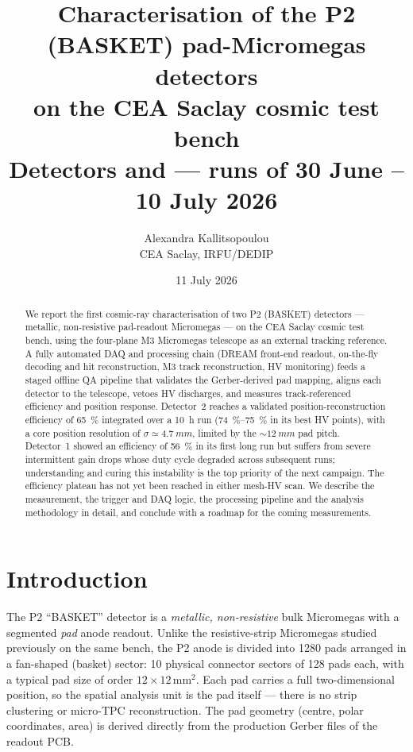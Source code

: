 \documentclass[11pt,a4paper]{article}
\title{\textbf{Characterisation of the P2 (BASKET) pad-Micromegas detectors\\
       on the CEA Saclay cosmic test bench}\\[1ex]
       \large Detectors \detone{} and \dettwo{} --- runs of 30 June -- 10 July 2026}
\author{Alexandra Kallitsopoulou\\ \small CEA Saclay, IRFU/DEDIP}
\date{11 July 2026}
\begin{document}
\maketitle

\begin{abstract}
\noindent
We report the first cosmic-ray characterisation of two P2 (BASKET) detectors ---
metallic, non-resistive pad-readout Micromegas --- on the CEA Saclay cosmic test
bench, using the four-plane M3 Micromegas telescope as an external tracking
reference. A fully automated DAQ and processing chain (DREAM front-end readout,
on-the-fly decoding and hit reconstruction, M3 track reconstruction, HV
monitoring) feeds a staged offline QA pipeline that validates the
Gerber-derived pad mapping, aligns each detector to the telescope, vetoes
HV discharges, and measures track-referenced efficiency and position response.
Detector~2 reaches a validated position-reconstruction efficiency of
\SI{65}{\percent} integrated over a \SI{10}{h} run (\SIrange{74}{75}{\percent}
in its best HV points), with a core position resolution of
$\sigma \simeq \SI{4.7}{mm}$, limited by the \(\sim\SI{12}{mm}\) pad pitch.
Detector~1 showed an efficiency of \SI{56}{\percent} in its first long run but
suffers from severe intermittent gain drops whose duty cycle degraded across
subsequent runs; understanding and curing this instability is the top priority
of the next campaign. The efficiency plateau has not yet been reached in either
mesh-HV scan. We describe the measurement, the trigger and DAQ logic, the
processing pipeline and the analysis methodology in detail, and conclude with a
roadmap for the coming measurements.
\end{abstract}

\tableofcontents
\clearpage

\section{Introduction}

The P2 ``BASKET'' detector is a \emph{metallic, non-resistive} bulk Micromegas
with a segmented \emph{pad} anode readout. Unlike the resistive-strip
Micromegas studied previously on the same bench, the P2 anode is divided into
1280 pads arranged in a fan-shaped (basket) sector: 10 physical connector
sectors of 128 pads each, with a typical pad size of order
$12\times12\,\text{mm}^2$. Each pad carries a full two-dimensional position, so the
spatial analysis unit is the pad itself --- there is no strip clustering or
micro-TPC reconstruction. The pad geometry (centre, polar coordinates, area) is
derived directly from the production Gerber files of the readout PCB.
\end{document}
